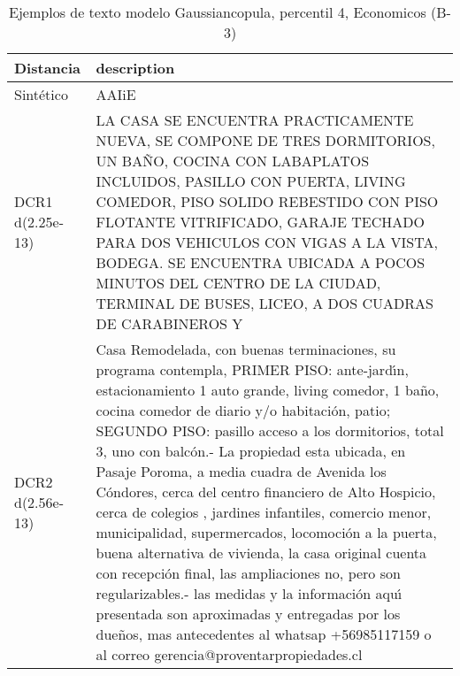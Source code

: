 \begin{table}[H]
\centering
\fontsize{10}{14}\selectfont
\caption{Ejemplos de texto modelo Gaussiancopula, percentil 4, Economicos (B-3)}
\label{table-example-economicos-b-3-gaussiancopula-4p-text}
\begin{tabular}{|l|m{35em}|}
\hline
\rowcolor[gray]{0.8}
Distancia & description \\
\hline Sintético & AAIiE \\
\hline DCR1 d(2.25e-13) & LA CASA SE ENCUENTRA PRACTICAMENTE NUEVA, SE COMPONE DE TRES DORMITORIOS, UN BA\~NO, COCINA CON LABAPLATOS INCLUIDOS, PASILLO CON PUERTA, LIVING COMEDOR, PISO SOLIDO REBESTIDO CON PISO FLOTANTE VITRIFICADO, GARAJE TECHADO PARA DOS VEHICULOS CON VIGAS A LA VISTA, BODEGA. SE ENCUENTRA UBICADA A POCOS MINUTOS DEL CENTRO DE LA CIUDAD, TERMINAL DE BUSES, LICEO, A DOS CUADRAS DE CARABINEROS Y  \\
\hline DCR2 d(2.56e-13) & Casa Remodelada, con buenas terminaciones, su programa contempla, PRIMER PISO: ante-jard{\'\i}n, estacionamiento 1 auto grande, living comedor, 1 ba\~no, cocina comedor de diario y/o habitaci\'on, patio; SEGUNDO PISO: pasillo acceso a los dormitorios, total 3, uno con balc\'on.- La propiedad esta ubicada, en Pasaje Poroma, a media cuadra de Avenida los C\'ondores, cerca del centro financiero de Alto Hospicio, cerca de colegios , jardines infantiles, comercio menor, municipalidad, supermercados, locomoci\'on a la puerta, buena alternativa de vivienda, la casa original cuenta con recepci\'on final, las ampliaciones no, pero son regularizables.-
las medidas y la informaci\'on aqu{\'\i} presentada son aproximadas y entregadas por los due\~nos, mas antecedentes al whatsap +56985117159 o al correo gerencia@proventarpropiedades.cl
  \\
\hline
\end{tabular}
\end{table}
